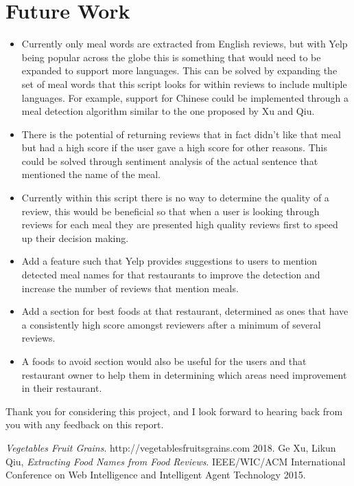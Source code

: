 \documentclass[12pt, openany]{scrbook}
\begin{document}
\section{Future Work}
\begin{itemize}
  \item Currently only meal words are extracted from English reviews, but with Yelp
		being popular across the globe this is something that would need to be
		expanded to support more languages. This can be solved by expanding the
		set of meal words that this script looks for within reviews to include
		multiple languages.
		For example, support for Chinese could be implemented through a meal
		detection algorithm similar to the one proposed by Xu and Qiu\cite{xu2015}.
  \item There is the potential of returning reviews that in fact didn't like that meal
		but had a high score if the user gave a high score for other reasons.
		This could be solved through sentiment analysis of the actual sentence that
		mentioned the name of the meal.
  \item Currently within this script there is no way to determine the quality of
		a review, this would be beneficial so that when a user is looking through
		reviews for each meal they are presented high quality reviews first to
		speed up their decision making.
  \item Add a feature such that Yelp provides suggestions to users to mention
		detected meal names for that restaurants to improve the detection
		and increase the number of reviews that mention meals.
  \item Add a section for best foods at that restaurant, determined as ones that have a
		consistently high score amongst reviewers after a minimum of several reviews.
  \item A foods to avoid section would also be useful for the users and that restaurant owner
		to help them in determining which areas need improvement in their restaurant.
\end{itemize}


\noindent Thank you for considering this project, and I look forward to hearing back from
you with any feedback on this report.

\begin{thebibliography}{9}

  \emph{Vegetables Fruit Grains}.
  http://vegetablesfruitsgrains.com
  2018.
  Ge Xu, Likun Qiu,
  \emph{Extracting Food Names from Food Reviews}.
  IEEE/WIC/ACM International Conference on Web Intelligence and Intelligent Agent Technology
  2015.

\end{thebibliography}
\end{document}
